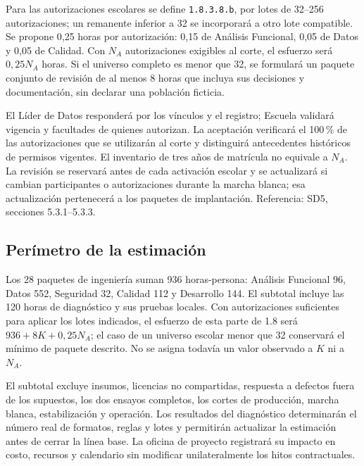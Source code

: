 Para las autorizaciones escolares se define \texttt{1.8.3.8.b}, por lotes de 32--256 autorizaciones; un remanente inferior a 32 se incorporará a otro lote compatible. Se propone 0,25 horas por autorización: 0,15 de Análisis Funcional, 0,05 de Datos y 0,05 de Calidad. Con $N_A$ autorizaciones exigibles al corte, el esfuerzo será $0{,}25N_A$ horas. Si el universo completo es menor que 32, se formulará un paquete conjunto de revisión de al menos 8 horas que incluya sus decisiones y documentación, sin declarar una población ficticia.

El Líder de Datos responderá por los vínculos y el registro; Escuela validará vigencia y facultades de quienes autorizan. La aceptación verificará el 100\,\% de las autorizaciones que se utilizarán al corte y distinguirá antecedentes históricos de permisos vigentes. El inventario de tres años de matrícula no equivale a $N_A$. La revisión se reservará antes de cada activación escolar y se actualizará si cambian participantes o autorizaciones durante la marcha blanca; esa actualización pertenecerá a los paquetes de implantación. Referencia: SD5, secciones 5.3.1--5.3.3.

\subsection{Perímetro de la estimación}
Los 28 paquetes de ingeniería suman 936 horas-persona: Análisis Funcional 96, Datos 552, Seguridad 32, Calidad 112 y Desarrollo 144. El subtotal incluye las 120 horas de diagnóstico y sus pruebas locales. Con autorizaciones suficientes para aplicar los lotes indicados, el esfuerzo de esta parte de 1.8 será $936+8K+0{,}25N_A$; el caso de un universo escolar menor que 32 conservará el mínimo de paquete descrito. No se asigna todavía un valor observado a $K$ ni a $N_A$.

El subtotal excluye insumos, licencias no compartidas, respuesta a defectos fuera de los supuestos, los dos ensayos completos, los cortes de producción, marcha blanca, estabilización y operación. Los resultados del diagnóstico determinarán el número real de formatos, reglas y lotes y permitirán actualizar la estimación antes de cerrar la línea base. La oficina de proyecto registrará su impacto en costo, recursos y calendario sin modificar unilateralmente los hitos contractuales.
